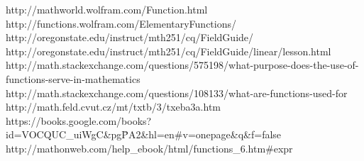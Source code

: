 \documentclass[11pt,oneside]{book}              %
\begin{document}
\begin{thebibliography}{10}

 http://mathworld.wolfram.com/Function.html
 http://functions.wolfram.com/ElementaryFunctions/
 http://oregonstate.edu/instruct/mth251/cq/FieldGuide/
 http://oregonstate.edu/instruct/mth251/cq/FieldGuide/linear/lesson.html
 http://math.stackexchange.com/questions/575198/what-purpose-does-the-use-of-functions-serve-in-mathematics
 http://math.stackexchange.com/questions/108133/what-are-functions-used-for
 http://math.feld.cvut.cz/mt/txtb/3/txeba3a.htm
 https://books.google.com/books?id=VOCQUC\_uiWgC\&pg\=PA2\&hl=en\#v=onepage\&q\&f=false
 http://mathonweb.com/help\_ebook/html/functions\_6.htm\#expr

\end{thebibliography}
\end{document}

